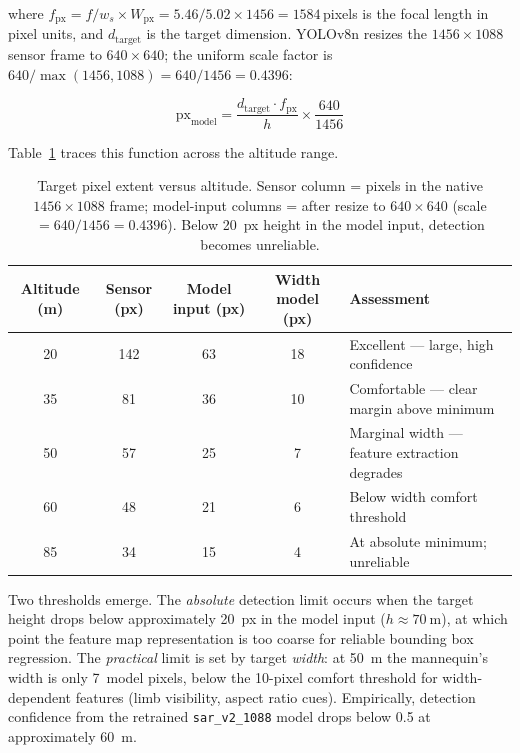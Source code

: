 \noindent where $f_{\mathrm{px}} = f / w_s \times W_{\mathrm{px}} = 5.46/5.02 \times 1456 = 1584$\,pixels is the focal length in pixel units, and $d_{\mathrm{target}}$ is the target dimension.
YOLOv8n resizes the $1456 \times 1088$ sensor frame to $640 \times 640$; the uniform scale factor is $640/\max(1456, 1088) = 640/1456 = 0.4396$:

\begin{equation}\label{eq:model-px}
  \mathrm{px}_{\mathrm{model}} = \frac{d_{\mathrm{target}} \cdot f_{\mathrm{px}}}{h} \times \frac{640}{1456}
\end{equation}

Table~\ref{tab:px-vs-alt} traces this function across the altitude range.

\begin{table}[ht]
  \centering\compactTable
  \caption{Target pixel extent versus altitude. Sensor column = pixels in the native $1456\!\times\!1088$ frame; model-input columns = after resize to $640\!\times\!640$ (scale $= 640/1456 = 0.4396$). Below \SI{20}{px} height in the model input, detection becomes unreliable.}\label{tab:px-vs-alt}
  \begin{tabularx}{\linewidth}{@{}c c c c X@{}}
    \toprule
    \textbf{Altitude (m)} & \textbf{Sensor (px)} & \textbf{Model input (px)} & \textbf{Width model (px)} & \textbf{Assessment} \\
    \midrule
    20 & 142 & 63 & 18 & Excellent --- large, high confidence \\
    35 & 81  & 36 & 10 & Comfortable --- clear margin above minimum \\
    50 & 57  & 25 & 7  & Marginal width --- feature extraction degrades \\
    60 & 48  & 21 & 6  & Below width comfort threshold \\
    85 & 34  & 15 & 4  & At absolute minimum; unreliable \\
    \bottomrule
  \end{tabularx}
\end{table}

Two thresholds emerge.
The \emph{absolute} detection limit occurs when the target height drops below approximately \SI{20}{px} in the model input ($h \approx \SI{70}{\metre}$), at which point the feature map representation is too coarse for reliable bounding box regression.
The \emph{practical} limit is set by target \emph{width}: at \SI{50}{\metre} the mannequin's width is only 7~model pixels, below the 10-pixel comfort threshold for width-dependent features (limb visibility, aspect ratio cues).
Empirically, detection confidence from the retrained \texttt{sar\_v2\_1088} model drops below 0.5 at approximately \SI{60}{\metre}.

